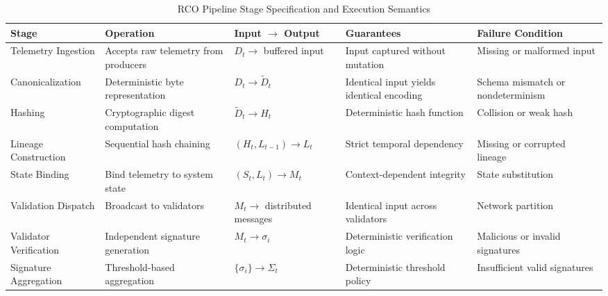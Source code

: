 \begin{table}[htbp]
\footnotesize
\centering
\caption{RCO Pipeline Stage Specification and Execution Semantics}
\label{tab:pipeline-stages}

\renewcommand{\arraystretch}{1.25}

\begin{tabularx}{\textwidth}{|p{2.3cm}|X|X|X|X|}
\hline
\textbf{Stage} & \textbf{Operation} & \textbf{Input $\rightarrow$ Output} & \textbf{Guarantees} & \textbf{Failure Condition} \\
\hline

Telemetry Ingestion & Accepts raw telemetry from producers & $D_t \rightarrow$ buffered input & Input captured without mutation & Missing or malformed input \\

\hline

Canonicalization & Deterministic byte representation & $D_t \rightarrow \tilde{D}_t$ & Identical input yields identical encoding & Schema mismatch or nondeterminism \\

\hline

Hashing & Cryptographic digest computation & $\tilde{D}_t \rightarrow H_t$ & Deterministic hash function & Collision or weak hash \\

\hline

Lineage Construction & Sequential hash chaining & $(H_t, L_{t-1}) \rightarrow L_t$ & Strict temporal dependency & Missing or corrupted lineage \\

\hline

State Binding & Bind telemetry to system state & $(S_t, L_t) \rightarrow M_t$ & Context-dependent integrity & State substitution \\

\hline

Validation Dispatch & Broadcast to validators & $M_t \rightarrow$ distributed messages & Identical input across validators & Network partition \\

\hline

Validator Verification & Independent signature generation & $M_t \rightarrow \sigma_i$ & Deterministic verification logic & Malicious or invalid signatures \\

\hline

Signature Aggregation & Threshold-based aggregation & $\{\sigma_i\} \rightarrow \Sigma_t$ & Deterministic threshold policy & Insufficient valid signatures \\


\end{tabularx}
\end{table}
